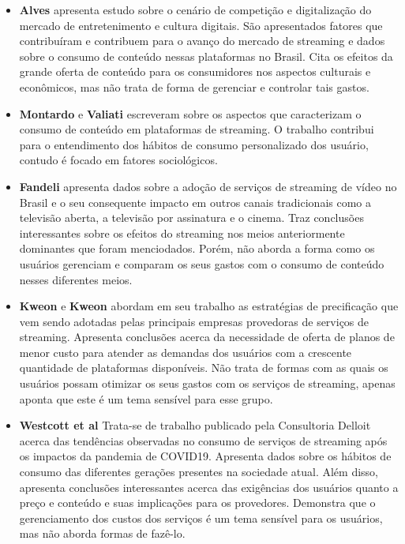 \documentclass[conference]{IEEEtran}
\begin{document}
\begin{itemize}
\item \textbf{Alves} \cite{b1} apresenta estudo sobre o cenário de competição e digitalização do mercado de entretenimento e cultura digitais. São apresentados fatores que contribuíram e contribuem para o avanço do mercado de streaming e dados sobre o consumo de conteúdo nessas plataformas no Brasil. Cita os efeitos da grande oferta de conteúdo para os consumidores nos aspectos culturais e econômicos, mas não trata de forma de gerenciar e controlar tais gastos.

\item \textbf{Montardo} e \textbf{Valiati} \cite{b2} escreveram sobre os aspectos que caracterizam o consumo de conteúdo em plataformas de streaming. O trabalho contribui para o entendimento dos hábitos de consumo personalizado dos usuário, contudo é focado em fatores sociológicos.

\item \textbf{Fandeli} \cite{b3} apresenta dados sobre a adoção de serviços de streaming de vídeo no Brasil e o seu consequente impacto em outros canais tradicionais como a televisão aberta, a televisão por assinatura e o cinema. Traz conclusões interessantes sobre os efeitos do streaming nos meios anteriormente dominantes que foram menciodados. Porém, não aborda a forma como os usuários gerenciam e comparam os seus gastos com o consumo de conteúdo nesses diferentes meios.

\item \textbf{Kweon} e \textbf{Kweon} \cite{b4} abordam em seu trabalho as estratégias de precificação que vem sendo adotadas pelas principais empresas provedoras de serviços de streaming. Apresenta conclusões acerca da necessidade de oferta de planos de menor custo para atender as demandas dos usuários com a crescente quantidade de plataformas disponíveis. Não trata de formas com as quais os usuários possam otimizar os seus gastos com os serviços de streaming, apenas aponta que este é um tema sensível para esse grupo.

\item \textbf{Westcott et al} \cite{b5} Trata-se de trabalho publicado pela Consultoria Delloit acerca das tendências observadas no consumo de serviços de streaming após os impactos da pandemia de COVID19. Apresenta dados sobre os hábitos de consumo das diferentes gerações presentes na sociedade atual. Além disso, apresenta conclusões interessantes acerca das exigências dos usuários quanto a preço e conteúdo e suas implicações para os provedores. Demonstra que o gerenciamento dos custos dos serviços é um tema sensível para os usuários, mas não aborda formas de fazê-lo.


\end{itemize}
\end{document}

